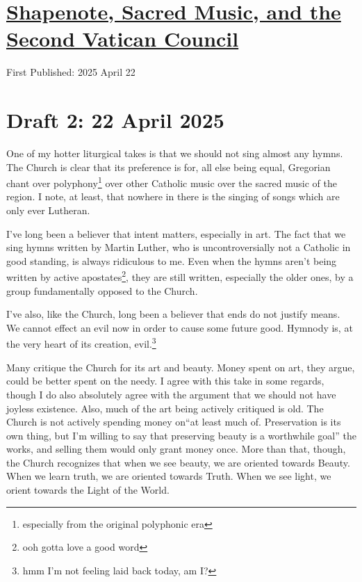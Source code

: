 \documentclass[12pt]{article}
\newcommand{\say}[1]{``#1''}
\renewcommand{\,}{\textsuperscript{,}}
\begin{document}
  
\doublespacing  
\section{\href{shapenote-sacred-music.html}{Shapenote, Sacred Music, and the Second Vatican Council}}  
First Published: 2025 April 22

\section{Draft 2: 22 April 2025}

One of my hotter liturgical takes is that we should not sing almost any hymns.  
The Church is clear that its preference is for, all else being equal, Gregorian chant over polyphony\footnote{especially from the original polyphonic era} over other Catholic music over the sacred music of the region.  
I note, at least, that nowhere in there is the singing of songs which are only ever Lutheran.

I've long been a believer that intent matters, especially in art.  
The fact that we sing hymns written by Martin Luther, who is uncontroversially not a Catholic in good standing, is always ridiculous to me.  
Even when the hymns aren't being written by active apostates\footnote{ooh gotta love a good word}, they are still written, especially the older ones, by a group fundamentally opposed to the Church.

I've also, like the Church, long been a believer that ends do not justify means.  
We cannot effect an evil now in order to cause some future good.  
Hymnody is, at the very heart of its creation, evil.\footnote{hmm I'm not feeling laid back today, am I?}

Many critique the Church for its art and beauty.  
Money spent on art, they argue, could be better spent on the needy.  
I agree with this take in some regards, though I do also absolutely agree with the argument that we should not have joyless existence.  
Also, much of the art being actively critiqued is old.  
The Church is not actively spending money on\say{at least much of. Preservation is its own thing, but I'm willing to say that preserving beauty is a worthwhile goal} the works, and selling them would only grant money once.  
More than that, though, the Church recognizes that when we see beauty, we are oriented towards Beauty.  
When we learn truth, we are oriented towards Truth.  
When we see light, we orient towards the Light of the World.
\end{document}
